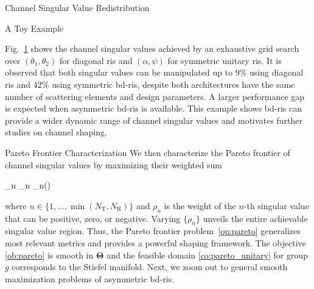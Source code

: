 \documentclass[journal]{IEEEtran}
\begin{document}
\begin{section}{Channel Singular Value Redistribution}
\begin{subsection}{A Toy Example}
\begin{figure}
			\label{sm:pc_singular_toy}
		\end{figure}
		Fig.~\ref{sm:pc_singular_toy} shows the channel singular values achieved by an exhaustive grid search over $(\theta_1, \theta_2)$ for diagonal \gls{ris} and $(\alpha, \psi)$ for symmetric unitary \gls{ris}.
		It is observed that both singular values can be manipulated up to $9\%$ using diagonal \gls{ris} and $42\%$ using symmetric \gls{bd}-\gls{ris}, despite both architectures have the same number of scattering elements and design parameters.
		A larger performance gap is expected when asymmetric \gls{bd}-\gls{ris} is available.
		This example shows \gls{bd}-\gls{ris} can provide a wider dynamic range of channel singular values and motivates further studies on channel shaping.
	\end{subsection}

	\begin{subsection}{Pareto Frontier Characterization}
		We then characterize the Pareto frontier of channel singular values by maximizing their weighted sum
		\begin{maxi!}
			{\scriptstyle{\mathbf{\Theta}}}{\sum_n \rho_n \sigma_n()}{\label{op:pareto}}{\label{ob:pareto}}
		\end{maxi!}
		where $n \in \{1,\ldots,\min(N_\mathrm{T}, N_\mathrm{R})\}$ and $\rho_n$ is the weight of the $n$-th singular value that can be positive, zero, or negative.
		Varying $\{\rho_n\}$ unveils the entire achievable singular value region.
		Thus, the Pareto frontier problem~\eqref{op:pareto} generalizes most relevant metrics and provides a powerful shaping framework.
		The objective \eqref{ob:pareto} is smooth in $\mathbf{\Theta}$ and the feasible domain \eqref{co:pareto_unitary} for group $g$ corresponds to the Stiefel manifold.
		Next, we zoom out to general smooth maximization problems of asymmetric \gls{bd}-\gls{ris}.


\end{subsection}
\end{section}
\end{document}
